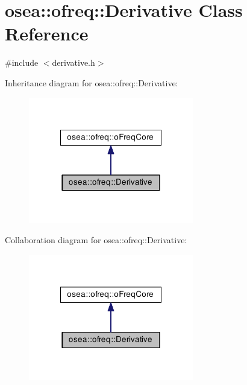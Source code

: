 \hypertarget{classosea_1_1ofreq_1_1_derivative}{\section{osea\-:\-:ofreq\-:\-:Derivative Class Reference}
\label{classosea_1_1ofreq_1_1_derivative}
}


{\ttfamily \#include $<$derivative.\-h$>$}



Inheritance diagram for osea\-:\-:ofreq\-:\-:Derivative\-:\nopagebreak
\begin{figure}[H]
\begin{center}
\leavevmode
\includegraphics[width=204pt]{classosea_1_1ofreq_1_1_derivative__inherit__graph}
\end{center}
\end{figure}


Collaboration diagram for osea\-:\-:ofreq\-:\-:Derivative\-:\nopagebreak
\begin{figure}[H]
\begin{center}
\leavevmode
\includegraphics[width=204pt]{classosea_1_1ofreq_1_1_derivative__coll__graph}
\end{center}
\end{figure}
